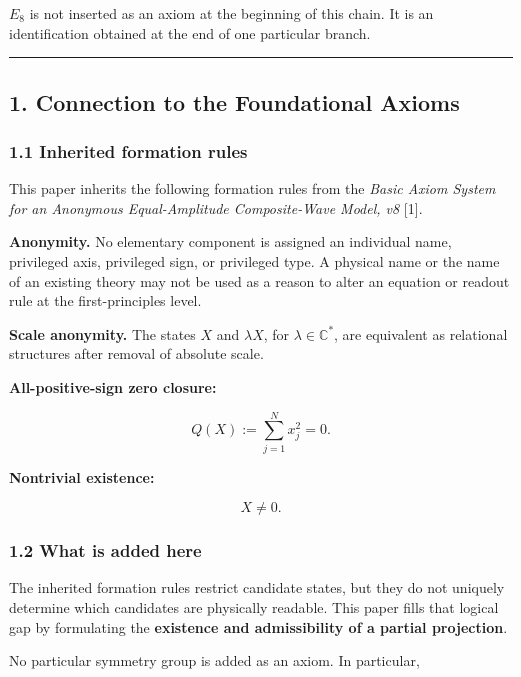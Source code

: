 \documentclass[
  a4paper,
]{article}
\begin{document}
\(E_8\) is not inserted as an axiom at the beginning of this chain. It
is an identification obtained at the end of one particular branch.

\begin{center}\rule{0.5\linewidth}{0.5pt}\end{center}

\subsection{1. Connection to the Foundational
Axioms}\label{connection-to-the-foundational-axioms}

\subsubsection{1.1 Inherited formation
rules}\label{inherited-formation-rules}

This paper inherits the following formation rules from the \emph{Basic
Axiom System for an Anonymous Equal-Amplitude Composite-Wave Model, v8}
{[}1{]}.

\textbf{Anonymity.} No elementary component is assigned an individual
name, privileged axis, privileged sign, or privileged type. A physical
name or the name of an existing theory may not be used as a reason to
alter an equation or readout rule at the first-principles level.

\textbf{Scale anonymity.} The states \(X\) and \(\lambda X\), for
\(\lambda\in\mathbb C^\ast\), are equivalent as relational structures
after removal of absolute scale.

\textbf{All-positive-sign zero closure:}

\[
Q(X):=\sum_{j=1}^{N}x_j^2=0.
\]

\textbf{Nontrivial existence:}

\[
X\neq0.
\]

\subsubsection{1.2 What is added here}\label{what-is-added-here}

The inherited formation rules restrict candidate states, but they do not
uniquely determine which candidates are physically readable. This paper
fills that logical gap by formulating the \textbf{existence and
admissibility of a partial projection}.

No particular symmetry group is added as an axiom. In particular,
\end{document}
